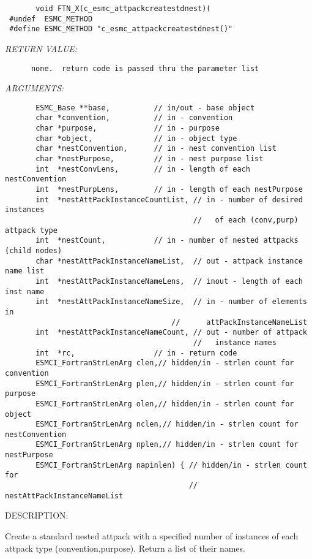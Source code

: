   
\begin{verbatim}       void FTN_X(c_esmc_attpackcreatestdnest)(
 #undef  ESMC_METHOD
 #define ESMC_METHOD "c_esmc_attpackcreatestdnest()"\end{verbatim}{\em RETURN VALUE:}
\begin{verbatim}      none.  return code is passed thru the parameter list
   \end{verbatim}{\em ARGUMENTS:}
\begin{verbatim}       ESMC_Base **base,          // in/out - base object
       char *convention,          // in - convention
       char *purpose,             // in - purpose
       char *object,              // in - object type
       char *nestConvention,      // in - nest convention list
       char *nestPurpose,         // in - nest purpose list
       int  *nestConvLens,        // in - length of each nestConvention
       int  *nestPurpLens,        // in - length of each nestPurpose
       int  *nestAttPackInstanceCountList, // in - number of desired instances
                                           //   of each (conv,purp) attpack type
       int  *nestCount,           // in - number of nested attpacks (child nodes)
       char *nestAttPackInstanceNameList,  // out - attpack instance name list
       int  *nestAttPackInstanceNameLens,  // inout - length of each inst name
       int  *nestAttPackInstanceNameSize,  // in - number of elements in 
                                      //      attPackInstanceNameList
       int  *nestAttPackInstanceNameCount, // out - number of attpack 
                                           //   instance names
       int  *rc,                  // in - return code
       ESMCI_FortranStrLenArg clen,// hidden/in - strlen count for convention
       ESMCI_FortranStrLenArg plen,// hidden/in - strlen count for purpose
       ESMCI_FortranStrLenArg olen,// hidden/in - strlen count for object
       ESMCI_FortranStrLenArg nclen,// hidden/in - strlen count for nestConvention
       ESMCI_FortranStrLenArg nplen,// hidden/in - strlen count for nestPurpose
       ESMCI_FortranStrLenArg napinlen) { // hidden/in - strlen count for 
                                          //   nestAttPackInstanceNameList
   \end{verbatim}
{\sf DESCRIPTION:\\ }


       Create a standard nested attpack with a specified number of instances
       of each attpack type (convention,purpose).  Return a list of their names.
   
